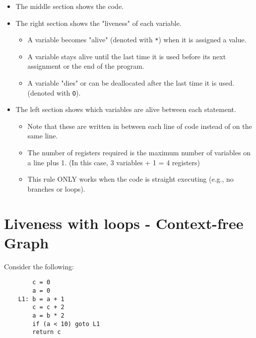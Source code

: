 \documentclass[10pt]{article}
\begin{document}
\begin{itemize}
    \item The middle section shows the code.
    \item The right section shows the "liveness" of each variable.
    \begin{itemize}
        \item A variable becomes "alive" (denoted with \texttt{*}) when it is assigned a value.
        \item A variable stays alive until the last time it is used before its next assignment or the end of the program.
        \item A variable "dies" or can be deallocated after the last time it is used.  (denoted with \texttt{O}).
    \end{itemize}   
    \item The left section shows which variables are alive between each statement.
    \begin{itemize}
        \item Note that these are written in between each line of code instead of on the same line.
        \item The number of registers required is the maximum number of variables on a line plus 1.  (In this case, 3 variables + 1 = 4 registers)
        \item This rule ONLY works when the code is straight executing (e.g., no branches or loops).
    \end{itemize}
\end{itemize}

\section*{Liveness with loops - Context-free Graph}
Consider the following:
\begin{verbatim}
        c = 0
        a = 0
    L1: b = a + 1
        c = c + 2
        a = b * 2
        if (a < 10) goto L1
        return c
\end{verbatim}
\end{document}
